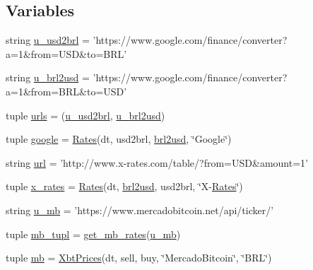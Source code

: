 \subsection*{Variables}
\begin{DoxyCompactItemize}
\item 
string \hyperlink{namespaceraw__urlparser_a63e1f0abe7b1f43c4891ce9aec98261d}{u\-\_\-usd2brl} = 'https\-://www.\-google.\-com/finance/converter?a=1\&from=U\-S\-D\&to=B\-R\-L'
\item 
string \hyperlink{namespaceraw__urlparser_a876711ddd7ebb3991a35cc1768d1d22c}{u\-\_\-brl2usd} = 'https\-://www.\-google.\-com/finance/converter?a=1\&from=B\-R\-L\&to=U\-S\-D'
\item 
tuple \hyperlink{namespaceraw__urlparser_aded92a1146e1ce1f14fd79a361f947f9}{urls} = (\hyperlink{namespaceraw__urlparser_a63e1f0abe7b1f43c4891ce9aec98261d}{u\-\_\-usd2brl}, \hyperlink{namespaceraw__urlparser_a876711ddd7ebb3991a35cc1768d1d22c}{u\-\_\-brl2usd})
\item 
tuple \hyperlink{namespaceraw__urlparser_a8d7c05a0ed7b2f3a3014caa73a2999d1}{google} = \hyperlink{classraw__urlparser_1_1_rates}{Rates}(dt, usd2brl, \hyperlink{namespaceraw__urlparser_a382c2b22f2386b1e493674c7d72b9b95}{brl2usd}, \char`\"{}Google\char`\"{})
\item 
string \hyperlink{namespaceraw__urlparser_a9242b893f4f49ef7cc0d4e599b70daa4}{url} = 'http\-://www.\-x-\/rates.\-com/table/?from=U\-S\-D\&amount=1'
\item 
tuple \hyperlink{namespaceraw__urlparser_a26bc8d57698e57014b8c066074fb9937}{x\-\_\-rates} = \hyperlink{classraw__urlparser_1_1_rates}{Rates}(dt, \hyperlink{namespaceraw__urlparser_a382c2b22f2386b1e493674c7d72b9b95}{brl2usd}, usd2brl, \char`\"{}X-\/\hyperlink{classraw__urlparser_1_1_rates}{Rates}\char`\"{})
\item 
string \hyperlink{namespaceraw__urlparser_a9a840f174b92a24c415b88c87e84b73d}{u\-\_\-mb} = 'https\-://www.\-mercadobitcoin.\-net/api/ticker/'
\item 
tuple \hyperlink{namespaceraw__urlparser_ac8242502920772d4c44b42f24492acd5}{mb\-\_\-tupl} = \hyperlink{namespaceraw__urlparser_a56532368ca9848b5f2ab298e3e6232bb}{get\-\_\-mb\-\_\-rates}(\hyperlink{namespaceraw__urlparser_a9a840f174b92a24c415b88c87e84b73d}{u\-\_\-mb})
\item 
tuple \hyperlink{namespaceraw__urlparser_a964275295a1dcba5dbdc3b113a75c4bb}{mb} = \hyperlink{classraw__urlparser_1_1_xbt_prices}{Xbt\-Prices}(dt, sell, buy, \char`\"{}Mercado\-Bitcoin\char`\"{}, \char`\"{}B\-R\-L\char`\"{})

\end{DoxyCompactItemize}
